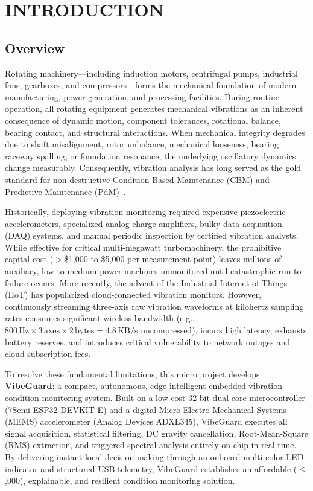 \chapter{INTRODUCTION}
\label{ch:introduction}

\section{Overview}
Rotating machinery---including induction motors, centrifugal pumps, industrial fans, gearboxes, and compressors---forms the mechanical foundation of modern manufacturing, power generation, and processing facilities. During routine operation, all rotating equipment generates mechanical vibrations as an inherent consequence of dynamic motion, component tolerances, rotational balance, bearing contact, and structural interactions. When mechanical integrity degrades due to shaft misalignment, rotor unbalance, mechanical looseness, bearing raceway spalling, or foundation resonance, the underlying oscillatory dynamics change measurably. Consequently, vibration analysis has long served as the gold standard for non-destructive Condition-Based Maintenance (CBM) and Predictive Maintenance (PdM)~\cite{randall2011vibration}.

Historically, deploying vibration monitoring required expensive piezoelectric accelerometers, specialized analog charge amplifiers, bulky data acquisition (DAQ) systems, and manual periodic inspection by certified vibration analysts. While effective for critical multi-megawatt turbomachinery, the prohibitive capital cost ($>$\$1,000 to \$5,000 per measurement point) leaves millions of auxiliary, low-to-medium power machines unmonitored until catastrophic run-to-failure occurs. More recently, the advent of the Industrial Internet of Things (IIoT) has popularized cloud-connected vibration monitors. However, continuously streaming three-axis raw vibration waveforms at kilohertz sampling rates consumes significant wireless bandwidth (e.g., $800\,\text{Hz} \times 3\,\text{axes} \times 2\,\text{bytes} = 4.8\,\text{KB/s}$ uncompressed), incurs high latency, exhausts battery reserves, and introduces critical vulnerability to network outages and cloud subscription fees.

To resolve these fundamental limitations, this micro project develops \textbf{VibeGuard}: a compact, autonomous, edge-intelligent embedded vibration condition monitoring system. Built on a low-cost 32-bit dual-core microcontroller (7Semi ESP32-DEVKIT-E) and a digital Micro-Electro-Mechanical Systems (MEMS) accelerometer (Analog Devices ADXL345), VibeGuard executes all signal acquisition, statistical filtering, DC gravity cancellation, Root-Mean-Square (RMS) extraction, and triggered spectral analysis entirely on-chip in real time. By delivering instant local decision-making through an onboard multi-color LED indicator and structured USB telemetry, VibeGuard establishes an affordable ($\le$,000), explainable, and resilient condition monitoring solution.

